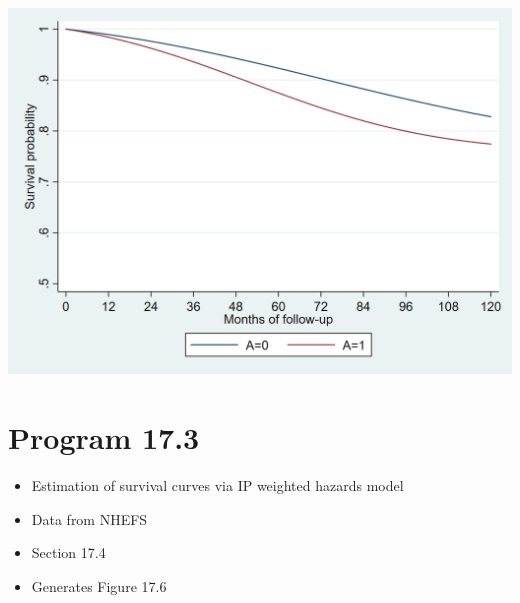 \documentclass[
  10pt,
]{book}
\providecommand{\tightlist}{%
  \setlength{\itemsep}{0pt}\setlength{\parskip}{0pt}}
\begin{document}
\begin{center}\includegraphics[width=0.85\linewidth]{./figs/stata-fig-17-2} \end{center}

\hypertarget{program-17.3}{%
\section{Program 17.3}\label{program-17.3}}

\begin{itemize}
\tightlist
\item
  Estimation of survival curves via IP weighted hazards model
\item
  Data from NHEFS
\item
  Section 17.4
\item
  Generates Figure 17.6
\end{itemize}
\end{document}
